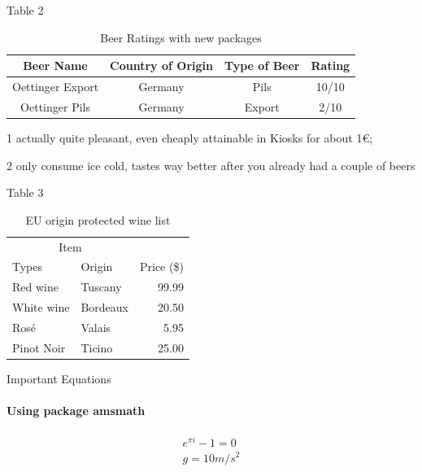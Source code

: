 \documentclass[10pt]{beamer}
\begin{document}
\begin{frame}{Table 2}
\begin{table}[h]
\begin{center}
\begin{threeparttable}
\begin{tabular}{c c c c}
    \toprule
    \textbf{Beer Name} & \textbf{Country of Origin} & \textbf{Type of Beer} & \textbf{Rating} \\ 
    \midrule
      Oettinger Export\tnote{1}   & Germany & Pils & 10/10 \\
      Oettinger Pils\tnote{2}   & Germany & Export & 2/10 \\ 
      \bottomrule
\end{tabular}
\begin{tablenotes}
\item[1] \footnotesize actually quite pleasant, even cheaply attainable in Kiosks for about 1€; \item[2] \footnotesize only consume ice cold, tastes way better after you already had a couple of beers
\end{tablenotes}
\end{threeparttable}
\end{center}
\caption{Beer Ratings with new packages}{}
\label{table:2}
\end{table}
\end{frame}

\begin{frame}{Table 3}
\begin{table}[h]
\centering
\begin{tabular}{llr}
\hline
\multicolumn{2}{c}{Item} \\
\cline{1-2}
Types    & Origin & Price (\$) \\
\hline
Red wine      & Tuscany     & 99.99      \\
White wine       & Bordeaux     & 20.50      \\
Rosé       & Valais     & 5.95      \\
Pinot Noir & Ticino      & 25.00       \\
\hline
\end{tabular}
\caption{EU origin protected wine list}
 \label{table:3}
\end{table}
\end{frame}

\begin{frame}{Important Equations}
\framesubtitle{Using package amsmath}
	\begin{gather}
	  	e^{\pi i}  - 1 = 0 \\
	 	 g = 10 m/s^2
	\end{gather}
\end{frame}
\end{document}
